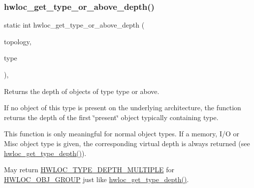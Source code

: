 \subsubsection{\texorpdfstring{hwloc\+\_\+get\+\_\+type\+\_\+or\+\_\+above\+\_\+depth()}{hwloc\_get\_type\_or\_above\_depth()}}
{\footnotesize\ttfamily static int hwloc\+\_\+get\+\_\+type\+\_\+or\+\_\+above\+\_\+depth (\begin{DoxyParamCaption}\item[{\hyperlink{a00186_ga9d1e76ee15a7dee158b786c30b6a6e38}{hwloc\+\_\+topology\+\_\+t}}]{topology,  }\item[{\hyperlink{a00184_gacd37bb612667dc437d66bfb175a8dc55}{hwloc\+\_\+obj\+\_\+type\+\_\+t}}]{type }\end{DoxyParamCaption})\hspace{0.3cm}{\ttfamily [inline]}, {\ttfamily [static]}}



Returns the depth of objects of type {\ttfamily type} or above. 

If no object of this type is present on the underlying architecture, the function returns the depth of the first \char`\"{}present\char`\"{} object typically containing {\ttfamily type}.

This function is only meaningful for normal object types. If a memory, I/O or Misc object type is given, the corresponding virtual depth is always returned (see \hyperlink{a00187_ga8bec782e21be313750da70cf7428b374}{hwloc\+\_\+get\+\_\+type\+\_\+depth()}).

May return \hyperlink{a00187_ggaf4e663cf42bbe20756b849c6293ef575ae99465995cacde6c210d5fc2e409798c}{H\+W\+L\+O\+C\+\_\+\+T\+Y\+P\+E\+\_\+\+D\+E\+P\+T\+H\+\_\+\+M\+U\+L\+T\+I\+P\+LE} for \hyperlink{a00184_ggacd37bb612667dc437d66bfb175a8dc55a5269ef95be72f88465559d35c9b7ad56}{H\+W\+L\+O\+C\+\_\+\+O\+B\+J\+\_\+\+G\+R\+O\+UP} just like \hyperlink{a00187_ga8bec782e21be313750da70cf7428b374}{hwloc\+\_\+get\+\_\+type\+\_\+depth()}. \mbox{\label{a00187_ga8125328e69eba709c33ea8055c12589b}} 
